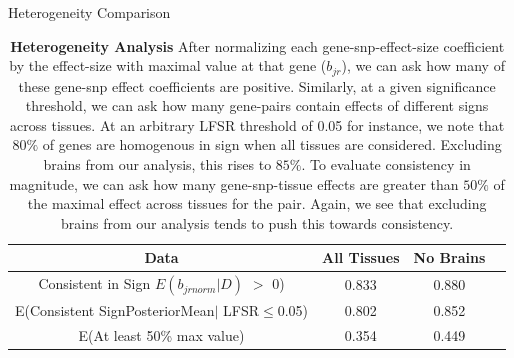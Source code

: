 \begin{table}[htbp]
\caption{Heterogeneity Comparison}
\centering
\begin{tabular}{c c c c}
\hline\hline
Data & All Tissues  & No Brains  \\ [0.5ex] %
\hline
Consistent in Sign $E(b_{jrnorm}|D)$ $>$ 0) &0.833&0.880 \\
E(Consistent SignPosteriorMean$\mid$ LFSR$\leq$0.05)&0.802&0.852\\
E(At least 50\% max value) &0.354&0.449\\
\hline
\end{tabular}
\label{table:het}
\caption{\textbf{Heterogeneity Analysis} After normalizing each gene-snp-effect-size coefficient by the effect-size with maximal value at that gene ($b_{jr}$), we can ask how many of these gene-snp effect coefficients are positive. Similarly, at a given significance threshold, we can ask how many gene-pairs contain effects of different signs across tissues. At an arbitrary LFSR threshold of 0.05 for instance, we note that $80\%$ of genes are homogenous in sign when all tissues are considered. Excluding brains from our analysis, this rises to $85\%$. To evaluate consistency in magnitude, we can ask how many gene-snp-tissue effects are greater than $50\%$ of the maximal effect across tissues for the pair. Again, we see that excluding brains from our analysis tends to push this towards consistency.}
\end{table} \newline




